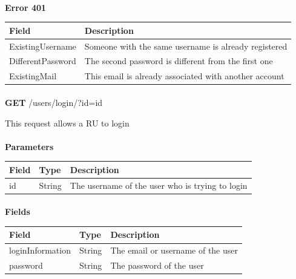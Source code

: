					\paragraph{}
						\textbf{Error 401}
						\begin{table}[!h]
							\begin{tabular}{L{0.3\textwidth}L{0.5\textwidth}}
								\toprule
								Field & Description \\
								\midrule
								 ExistingUsername & Someone with the same username is already registered \\
								 DifferentPassword & The second password is different from the first one \\
								 ExistingMail & This email is already associated with another account \\
								 \bottomrule
							\end{tabular}
						\end{table}
						
						\paragraph{}
						\textbf{GET} /users/login/?id={id}
						
						This request allows a RU to login
						\paragraph{}
							\textbf{Parameters}
							\begin{table}[!h]
								\begin{tabular}{L{0.2\textwidth}L{0.2\textwidth}L{0.4\textwidth}}
									\toprule
									Field & Type & Description \\
									\midrule
								 	id & String & The username of the user who is trying to login \\
								 	\bottomrule
								\end{tabular}
							\end{table}
						\paragraph{}
							\textbf{Fields}
							\begin{table}[!h]
								\begin{tabular}{L{0.25\textwidth}L{0.15\textwidth}L{0.4\textwidth}}
									\toprule
									Field & Type & Description \\
									\midrule
								 	loginInformation & String & The email or username of the user \\
								 	password & String & The password of the user \\
								 	\bottomrule
								\end{tabular}
							\end{table}
						\clearpage
